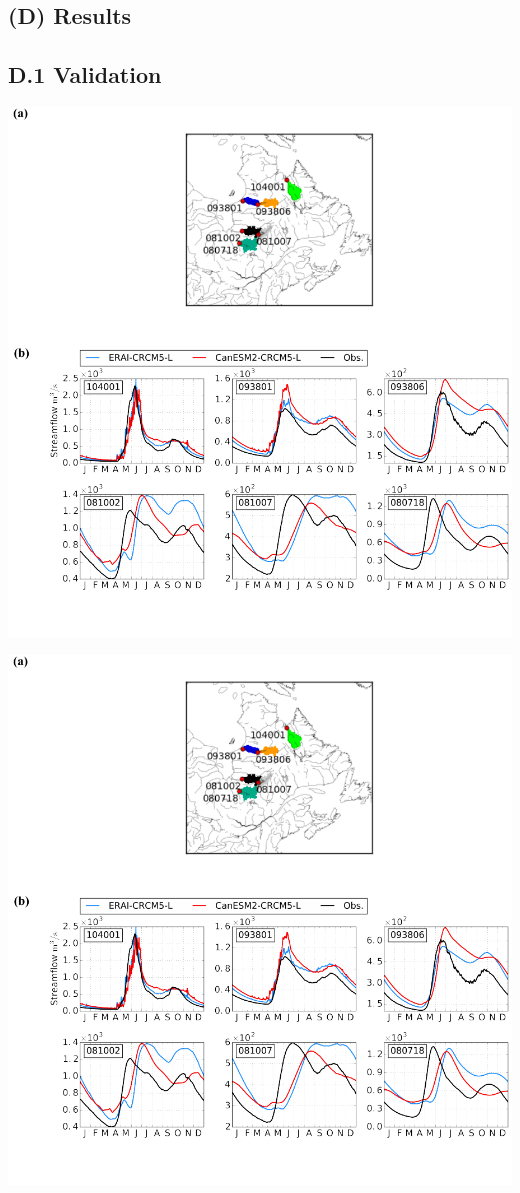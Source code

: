 \documentclass[a0,landscape]{a0poster}
\begin{document}
\begin{multicols*}{3}
\section*{(D) Results}

\subsection*{D.1 Validation}
\begin{minipage}[c]{0.45\linewidth}
\begin{center}
  \includegraphics[width=0.55\linewidth]{streamflow_validation_6_positions}
\end{center}
\end{minipage}\hfill
%
\begin{minipage}[c]{0.50\linewidth}
\begin{center}
  \includegraphics[width=0.75\linewidth]{streamflow_validation_6}

\end{center}
\end{minipage}
\end{multicols*}
\end{document}
